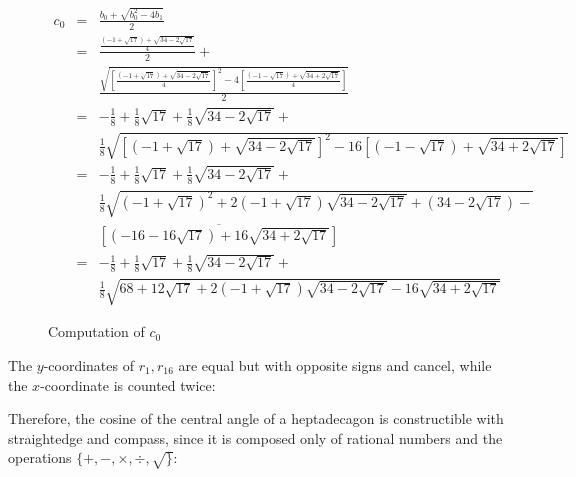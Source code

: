 \documentclass[11pt,a4paper]{article}
\newenvironment{form}[1]{%
\begin{displaymath}%
\renewcommand{\arraystretch}{#1}%
\begin{array}{lcl}}%
{\end{array}%
\end{displaymath}%
}
\newcommand*{\disfrac}[2]{\displaystyle\frac{#1}{#2}}
\begin{document}
\begin{figure}
\begin{form}{2.8}
c_0&=&\disfrac{b_0+\sqrt{b_0^2-4b_1}}{2}\\
&=&\disfrac{
     \disfrac{
     (-1+\sqrt{17}) + 
     \sqrt{34-2\sqrt{17}}
   }{4}}{2} + \\
&& 
    \disfrac{
       \sqrt{\left[\disfrac{
     (-1+\sqrt{17}) + 
     \sqrt{34-2\sqrt{17}}
   }{4}\right]^2-4\left[\disfrac{
     (-1-\sqrt{17}) + 
     \sqrt{34+2\sqrt{17}}
   }{4}\right]}
   }{2}\\
&=&-\disfrac{1}{8}+\disfrac{1}{8}\sqrt{17} + 
     \disfrac{1}{8}\sqrt{34-2\sqrt{17}}
    + \\
   &&
     \disfrac{1}{8}\sqrt{
     \left[
     (-1+\sqrt{17}) + 
     \sqrt{34-2\sqrt{17}}
   \right]^2-16\left[
     (-1-\sqrt{17}) + 
     \sqrt{34+2\sqrt{17}}
   \right]}
\\
&=&-\disfrac{1}{8}+\disfrac{1}{8}\sqrt{17} + 
     \disfrac{1}{8}\sqrt{34-2\sqrt{17}}
    + \\
   &&
     \disfrac{1}{8}\sqrt{
     (-1+\sqrt{17})^2 + 
     2(-1+\sqrt{17})\sqrt{34-2\sqrt{17}}+
     (34-2\sqrt{17})
   -}\\
   &&\overline{
     \left[(-16-16\sqrt{17}) + 
     16\sqrt{34+2\sqrt{17}}\right]
   }
\\
&=&-\disfrac{1}{8}+\disfrac{1}{8}\sqrt{17} + 
     \disfrac{1}{8}\sqrt{34-2\sqrt{17}}
    + \\
   &&
     \disfrac{1}{8}\sqrt{
     68+12\sqrt{17} + 
     2(-1+\sqrt{17})\sqrt{34-2\sqrt{17}}
   -16
     \sqrt{34+2\sqrt{17}}
   }

\end{form}
\caption{Computation of $c_0$}\label{fig.c0}
\end{figure}


\clearpage

The $y$-coordinates of $r_1,r_{16}$ are equal but with opposite signs and cancel, while the $x$-coordinate is counted twice:\label{page.cosine}
\begin{center}
\end{center}
Therefore, the cosine of the central angle of a heptadecagon is constructible with straightedge and compass, since it is composed only of rational numbers and the operations $\{+,-,\times,\div,\surd\}$:
\end{document}

